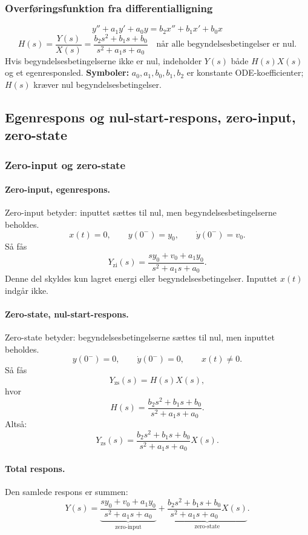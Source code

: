 \subsubsection{Overføringsfunktion fra differentialligning}
\[
y''+a_1y'+a_0y=b_2x''+b_1x'+b_0x
\]
\[
H(s)=\frac{Y(s)}{X(s)}=\frac{b_2s^2+b_1s+b_0}{s^2+a_1s+a_0}
\quad\text{når alle begyndelsesbetingelser er nul.}
\]
Hvis begyndelsesbetingelserne ikke er nul, indeholder \(Y(s)\) både \(H(s)X(s)\) og et egenresponsled.
\textbf{Symboler:} \(a_0,a_1,b_0,b_1,b_2\) er konstante ODE-koefficienter; \(H(s)\) kræver nul begyndelsesbetingelser.

\subsection{Egenrespons og nul-start-respons, zero-input, zero-state}

\subsubsection{Zero-input og zero-state}

\paragraph{Zero-input, egenrespons.}
Zero-input betyder: inputtet sættes til nul, men begyndelsesbetingelserne beholdes.
\[
x(t)=0,\qquad y(0^-)=y_0,\qquad \dot y(0^-)=v_0.
\]
Så fås
\[
Y_{\mathrm{zi}}(s)
=
\frac{s y_0+v_0+a_1y_0}{s^2+a_1s+a_0}.
\]
Denne del skyldes kun lagret energi eller begyndelsesbetingelser. Inputtet \(x(t)\) indgår ikke.

\paragraph{Zero-state, nul-start-respons.}
Zero-state betyder: begyndelsesbetingelserne sættes til nul, men inputtet beholdes.
\[
y(0^-)=0,\qquad \dot y(0^-)=0,\qquad x(t)\neq 0.
\]
Så fås
\[
Y_{\mathrm{zs}}(s)=H(s)X(s),
\]
hvor
\[
H(s)
=
\frac{b_2s^2+b_1s+b_0}{s^2+a_1s+a_0}.
\]
Altså:
\[
Y_{\mathrm{zs}}(s)
=
\frac{b_2s^2+b_1s+b_0}{s^2+a_1s+a_0}X(s).
\]

\paragraph{Total respons.}
Den samlede respons er summen:
\[
Y(s)
=
\underbrace{\frac{s y_0+v_0+a_1y_0}{s^2+a_1s+a_0}}_{\text{zero-input}}
+
\underbrace{\frac{b_2s^2+b_1s+b_0}{s^2+a_1s+a_0}X(s)}_{\text{zero-state}}.
\]

